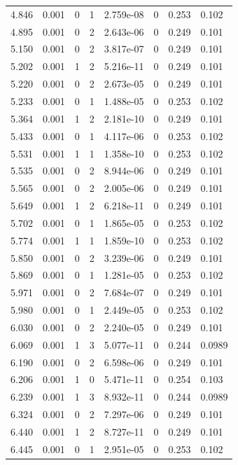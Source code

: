 \documentclass[preview]{standalone}
\begin{document}
{{{\begin{tabular}{L{1.2cm}C{1.2cm} C{0.3cm}C{0.5cm} C{1.4cm}C{1.4cm} C{1.4cm}C{1.4cm}}
  4.846  &  0.001  & 0     &  1 &  2.759e-08  & 0  & 0.253 &  0.102   \\ 
  4.895  &  0.001  & 0     &  2 &  2.643e-06  & 0  & 0.249 &  0.101   \\ 
  5.150  &  0.001  & 0     &  2 &  3.817e-07  & 0  & 0.249 &  0.101   \\ 
  5.202  &  0.001  & 1     &  2 &  5.216e-11  & 0  & 0.249 &  0.101   \\ 
  5.220  &  0.001  & 0     &  2 &  2.673e-05  & 0  & 0.249 &  0.101   \\ 
  5.233  &  0.001  & 0     &  1 &  1.488e-05  & 0  & 0.253 &  0.102   \\ 
  5.364  &  0.001  & 1     &  2 &  2.181e-10  & 0  & 0.249 &  0.101   \\ 
  5.433  &  0.001  & 0     &  1 &  4.117e-06  & 0  & 0.253 &  0.102   \\ 
  5.531  &  0.001  & 1     &  1 &  1.358e-10  & 0  & 0.253 &  0.102   \\ 
  5.535  &  0.001  & 0     &  2 &  8.944e-06  & 0  & 0.249 &  0.101   \\ 
  5.565  &  0.001  & 0     &  2 &  2.005e-06  & 0  & 0.249 &  0.101   \\ 
  5.649  &  0.001  & 1     &  2 &  6.218e-11  & 0  & 0.249 &  0.101   \\ 
  5.702  &  0.001  & 0     &  1 &  1.865e-05  & 0  & 0.253 &  0.102   \\ 
  5.774  &  0.001  & 1     &  1 &  1.859e-10  & 0  & 0.253 &  0.102   \\ 
  5.850  &  0.001  & 0     &  2 &  3.239e-06  & 0  & 0.249 &  0.101   \\ 
  5.869  &  0.001  & 0     &  1 &  1.281e-05  & 0  & 0.253 &  0.102   \\ 
  5.971  &  0.001  & 0     &  2 &  7.684e-07  & 0  & 0.249 &  0.101   \\ 
  5.980  &  0.001  & 0     &  1 &  2.449e-05  & 0  & 0.253 &  0.102   \\ 
  6.030  &  0.001  & 0     &  2 &  2.240e-05  & 0  & 0.249 &  0.101   \\ 
  6.069  &  0.001  & 1     &  3 &  5.077e-11  & 0  & 0.244 &  0.0989   \\ 
  6.190  &  0.001  & 0     &  2 &  6.598e-06  & 0  & 0.249 &  0.101   \\ 
  6.206  &  0.001  & 1     &  0 &  5.471e-11  & 0  & 0.254 &  0.103   \\ 
  6.239  &  0.001  & 1     &  3 &  8.932e-11  & 0  & 0.244 &  0.0989   \\ 
  6.324  &  0.001  & 0     &  2 &  7.297e-06  & 0  & 0.249 &  0.101   \\ 
  6.440  &  0.001  & 1     &  2 &  8.727e-11  & 0  & 0.249 &  0.101   \\ 
  6.445  &  0.001  & 0     &  1 &  2.951e-05  & 0  & 0.253 &  0.102   \\ 
\hline 
\end{tabular} 

}}}
\end{document}

